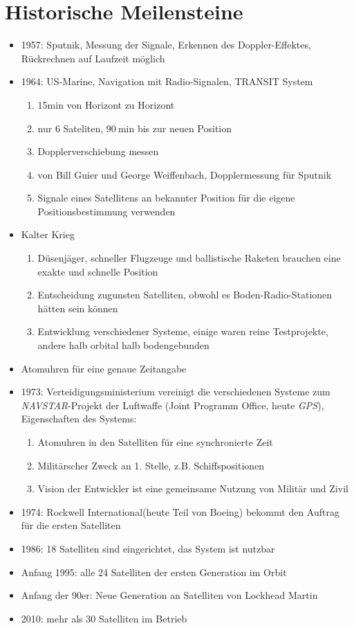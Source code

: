 \section{Historische Meilensteine}
\label{sec:historische-meilensteine}

\begin{itemize}
  \item 1957: Sputnik, Messung der Signale, Erkennen des Doppler-Effektes, Rückrechnen auf Laufzeit möglich
  \item 1964: US-Marine, Navigation mit Radio-Signalen, TRANSIT System
  \begin{enumerate}
      \item 15min von Horizont zu Horizont
      \item nur 6 Sateliten, $\SI{90}{\minute}$ bis zur neuen Position
      \item Dopplerverschiebung messen
      \item von Bill Guier und George Weiffenbach, Dopplermessung für Sputnik
      \item Signale eines Satellitens an bekannter Position für die eigene Positionsbestimmung verwenden
  \end{enumerate}
  \item Kalter Krieg
  \begin{enumerate}
      \item Düsenjäger, schneller Flugzeuge und ballistische Raketen brauchen eine exakte und schnelle Position
      \item Entscheidung zugunsten Satelliten, obwohl es Boden-Radio-Stationen hätten sein können
      \item Entwicklung verschiedener Systeme, einige waren reine Testprojekte, andere halb orbital halb bodengebunden
  \end{enumerate}
   \item Atomuhren für eine genaue Zeitangabe
   \item 1973: Verteidigungsministerium vereinigt die verschiedenen Systeme zum \\\textit{NAVSTAR}-Projekt der Luftwaffe (Joint Programm Office, heute \textit{GPS}),\\Eigenschaften des Systems:
   \begin{enumerate}
       \item Atomuhren in den Satelliten für eine synchronierte Zeit
       \item Militärscher Zweck an 1. Stelle, z.B. Schiffspositionen
       \item Vision der Entwickler ist eine gemeinsame Nutzung von Militär und Zivil
   \end{enumerate}
   \item 1974: Rockwell International(heute Teil von Boeing) bekommt den Auftrag für die ersten Satelliten
   \item 1986: 18 Satelliten sind eingerichtet, das System ist nutzbar
   \item Anfang 1995: alle 24 Satelliten der ersten Generation im Orbit
   \item Anfang der 90er: Neue Generation an Satelliten von Lockhead Martin
   \item 2010: mehr als 30 Satelliten im Betrieb
\end{itemize}
